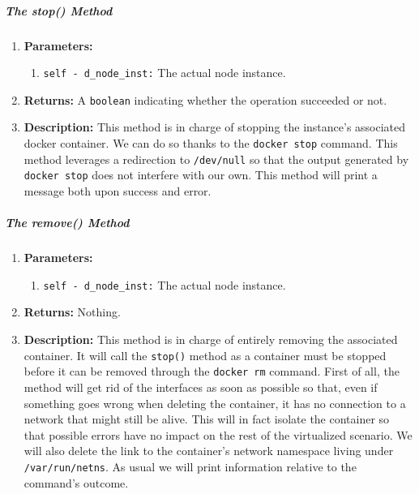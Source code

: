         \subparagraph{The stop() Method}
            \begin{enumerate}
                \item \textbf{Parameters:}
                \begin{enumerate}
                    \item \texttt{self - d\_node\_inst:} The actual node instance.
                \end{enumerate}
                \item \textbf{Returns:} A \texttt{boolean} indicating whether the operation succeeded or not.
                \item \textbf{Description:} This method is in charge of stopping the instance's associated docker container. We can do so thanks to the \texttt{docker stop} command. This method leverages a redirection to \texttt{/dev/null} so that the output generated by \texttt{docker stop} does not interfere with our own. This method will print a message both upon success and error.
            \end{enumerate}

        \subparagraph{The remove() Method}
            \begin{enumerate}
                \item \textbf{Parameters:}
                \begin{enumerate}
                    \item \texttt{self - d\_node\_inst:} The actual node instance.
                \end{enumerate}
                \item \textbf{Returns:} Nothing.
                \item \textbf{Description:} This method is in charge of entirely removing the associated container. It will call the \texttt{stop()} method as a container must be stopped before it can be removed through the \texttt{docker rm} command. First of all, the method will get rid of the interfaces as soon as possible so that, even if something goes wrong when deleting the container, it has no connection to a network that might still be alive. This will in fact isolate the container so that possible errors have no impact on the rest of the virtualized scenario. We will also delete the link to the container's network namespace living under \texttt{/var/run/netns}. As usual we will print information relative to the command's outcome.
            \end{enumerate}

